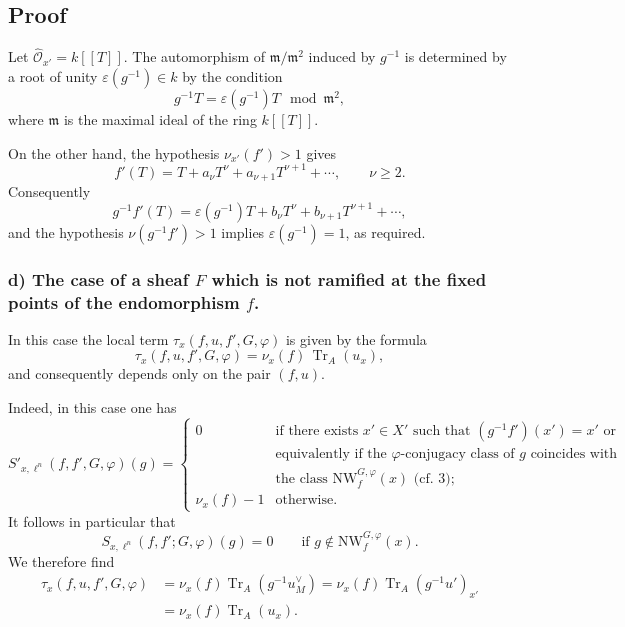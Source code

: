 \documentclass[11pt]{article}
\providecommand{\fm}{\mathfrak{m}}
\providecommand{\Tr}{\operatorname{Tr}}
\providecommand{\Tr}{\operatorname{Tr}}
\providecommand{\Tr}{\operatorname{Tr}}
\providecommand{\Tr}{\operatorname{Tr}}
\providecommand{\fm}{\mathfrak m}
\providecommand{\Tr}{\operatorname{Tr}}
\begin{document}
\subsection*{Proof}
Let $\widehat{\mathcal O}_{x'}=k[[T]]$. The automorphism of $\fm/\fm^2$ induced by $g^{-1}$ is determined by a root of unity $\varepsilon(g^{-1})\in k$ by the condition
\[
g^{-1}T=\varepsilon(g^{-1})T\mod \fm^2,
\]
where $\fm$ is the maximal ideal of the ring $k[[T]]$.

On the other hand, the hypothesis $\nu_{x'}(f')>1$ gives
\[
f'(T)=T+a_\nu T^\nu+a_{\nu+1}T^{\nu+1}+\cdots,
\qquad \nu\ge2.
\]
Consequently
\[
g^{-1}f'(T)=\varepsilon(g^{-1})T+b_\nu T^\nu+b_{\nu+1}T^{\nu+1}+\cdots,
\]
and the hypothesis $\nu(g^{-1}f')>1$ implies $\varepsilon(g^{-1})=1$, as required.

\subsubsection*{d) The case of a sheaf $F$ which is not ramified at the fixed points of the endomorphism $f$.}
In this case the local term $\tau_x(f,u,f',G,\varphi)$ is given by the formula
\begin{equation}\tag{6.4.6}
\tau_x(f,u,f',G,\varphi)=\nu_x(f)\,\Tr_A(u_x),
\end{equation}
and consequently depends only on the pair $(f,u)$.

Indeed, in this case one has
\begin{equation}\tag{6.4.7}
S'_{x,\ell^n}(f,f',G,\varphi)(g)=
\begin{cases}
0&\text{if there exists }x'\in X'\text{ such that }(g^{-1}f')(x')=x'\text{ or}\\
&\text{equivalently if the $\varphi$-conjugacy class of $g$ coincides with}\\
&\text{the class }\mathrm{NW}_{f}^{G,\varphi}(x)\text{ (cf. 3); }\\
\nu_x(f)-1&\text{otherwise.}
\end{cases}
\end{equation}
It follows in particular that
\begin{equation}\tag{6.4.8}
S_{x,\ell^n}(f,f';G,\varphi)(g)=0
\qquad \text{if } g\notin \mathrm{NW}_{f}^{G,\varphi}(x).
\end{equation}
We therefore find
\begin{equation}\tag{6.4.9}
\begin{aligned}
\tau_x(f,u,f',G,\varphi)
&=\nu_x(f)\Tr_A(g^{-1}u_M^\vee)
=\nu_x(f)\Tr_A(g^{-1}u')_{x'}\\
&=\nu_x(f)\Tr_A(u_x).
\end{aligned}
\end{equation}
\end{document}
